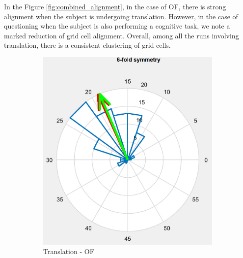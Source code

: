 \documentclass[a4paper]{article}
\begin{document}
In the Figure \ref{fig:combined_alignment}, in the case of OF, there is strong alignment when the subject is undergoing translation. However, in the case of questioning when the subject is also performing a cognitive task, we note a marked reduction of grid cell alignment. Overall, among all the runs involving translation, there is a consistent clustering of grid cells.

\begin{figure}[h]
    \centering
    \begin{subfigure}[b]{0.3\textwidth}
        \includegraphics[width=\linewidth]{alignment_trans_OF.png}
        \caption{Translation - OF}
        \label{fig:alignment_trans_OF}
    \end{subfigure}
    \hfill
    \begin{subfigure}[b]{0.3\textwidth}

\end{subfigure}
\end{figure}
\end{document}
